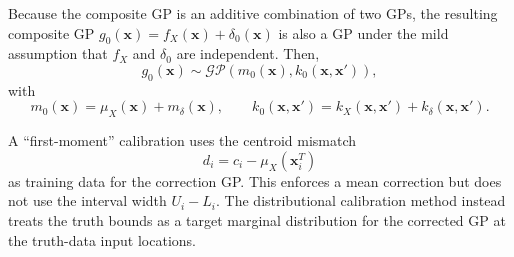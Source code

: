 \documentclass[a4paper,12pt]{article}
\newcommand{\x}{\mathbf{x}}
\begin{document}
Because the composite GP is an additive combination of two GPs, the resulting composite GP
$g_0(\x) = f_X(\x) + \delta_0(\x)$ is also a GP under the mild assumption that
$f_X$ and $\delta_0$ are independent. Then,
\begin{equation*}
    g_0(\x)
    \sim
    \mathcal{GP}
    \left(
    m_0(\x),
    k_0(\x,\x')
    \right),
\end{equation*}
with
\begin{equation*}
    m_0(\x)
    =
    \mu_X(\x)
    +
    m_\delta(\x),
    \qquad
    k_0(\x,\x')
    =
    k_X(\x,\x')
    +
    k_\delta(\x,\x').
\end{equation*}
%


A ``first-moment'' calibration uses the centroid mismatch
\begin{equation*}
    d_i
    =
    c_i
    -
    \mu_X(\x_i^T)
\end{equation*}
as training data for the correction GP.  This enforces a mean correction but
does not use the interval width $U_i-L_i$.  The distributional calibration
method instead treats the truth bounds as a target marginal distribution for the
corrected GP at the truth-data input locations.
\end{document}
